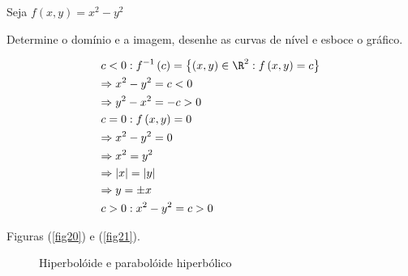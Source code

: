 \documentclass[11pt, oneside, a4paper]{gsm-l}
\begin{document}
\begin{exem}
Seja $f\left( {x,y} \right) = x^2 - y^2$

Determine o domínio e a imagem, desenhe as curvas de nível e esboce o gráfico.
\end{exem}

\newpage 

\begin{sol}
\[
\begin{gathered}
  c < 0:f^{ - 1} \left( c \right) = \left\{ {\left( {x,y} \right) \in \R^2 :f\left( {x,y} \right) = c} \right\} \hfill \\
\Rightarrow x^2  - y^2  = c < 0 \hfill \\
\Rightarrow y^2  - x^2  =  - c > 0 \hfill \\
c = 0:f\left( {x,y} \right) = 0 \hfill \\
\Rightarrow x^2  - y^2  = 0 \hfill \\
\Rightarrow x^2  = y^2  \hfill \\
\Rightarrow \left| x \right| = \left| y \right| \hfill \\
\Rightarrow y =  \pm x \hfill \\
c > 0:x^2  - y^2  = c > 0 \hfill \\
\end{gathered}
\]

Figuras (\ref{fig20}) e (\ref{fig21}).

\begin{figure}[!h]
  \centering
  \quad
  \caption{Hiperbol\'oide e parabol\'oide hiperb\'olico}
\end{figure}

\end{sol}
\end{document}
